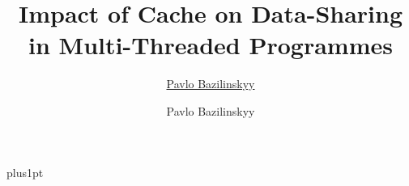\documentclass[twoside,11pt]{Latex/Classes/PhDthesisPSnPDF}
\title{Impact of Cache on Data-Sharing in Multi-Threaded Programmes}
\author{\href{mailto:pavlo.bazilinskyy@gmail.com}{Pavlo Bazilinskyy}}
\author{Pavlo Bazilinskyy}
\begin{document}

\renewcommand\baselinestretch{1.2}
\baselineskip=18pt plus1pt



\maketitle  %













%   

\let\savecleardoublepage\cleardoublepage
\let\cleardoublepage\clearpage 

\let\savecleardoublepage\cleardoublepage
\let\cleardoublepage\clearpage 


\frontmatter

\let\savecleardoublepage\cleardoublepage
\let\cleardoublepage\clearpage 

\end{document}
